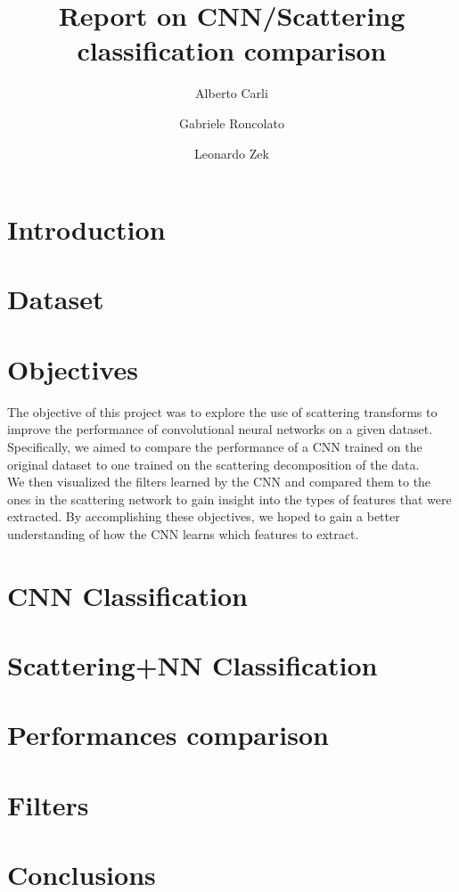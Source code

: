 \documentclass{report}
\title{Report on CNN/Scattering classification comparison}
\author{Alberto Carli \and Gabriele Roncolato \and Leonardo Zek}
\date{}
\begin{document}
\maketitle
\tableofcontents
\pagebreak

\chapter{Introduction}
\chapter{Dataset}
\chapter{Objectives}
The objective of this project was to explore the use of scattering transforms to improve the performance of convolutional neural networks on a given dataset.\\
Specifically, we aimed to compare the performance of a CNN trained on the original dataset to one trained on the scattering decomposition of the data.\\

We then visualized the filters learned by the CNN and compared them to the ones in the scattering network to gain insight into the types of features that were extracted. 
By accomplishing these objectives, we hoped to gain a better understanding of how the CNN learns which features to extract.

\chapter{CNN Classification}
\chapter{Scattering+NN Classification}
\chapter{Performances comparison}
\chapter{Filters}
\chapter{Conclusions}
\end{document}
